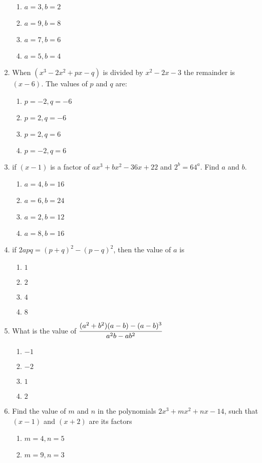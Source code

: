\begin{multicols}{2}
\begin{enumerate}[label={\arabic*.}]
\begin{enumerate}[label={\Alph*.}]
	\item \(a= 3, b =2\)
	\item \(a=9, b=8\)
	\item \(a=7, b =6\)
	\item \(a=5,b=4\)
	\end{enumerate}
\item When $(x^3 - 2x^2 + px -q)$ is divided by $x^2 - 2x -3$ the remainder is $(x-6)$. The values of $p$ and $q$ are: 
	\begin{enumerate}[label={\Alph*.}]
	\item \(p = -2, q = -6\)
	\item \(p = 2, q = -6\)
	\item \(p = 2, q = 6\)
	\item \(p = -2, q = 6\)
	\end{enumerate}
\item if $(x-1)$ is a factor of $ax^3 + bx^2 -36x + 22$ and $2^b = 64^a$. Find $a$ and $b$.
	\begin{enumerate}[label={\Alph*.}]
	\item \(a= 4, b =16\)
	\item \(a = 6, b =24\)
	\item \(a = 2, b =12\)
	\item \(a = 8, b = 16\)
	\end{enumerate}
\item if $2apq = (p+q)^2 - (p-q)^2$, then the value of $a$ is 
	\begin{enumerate}[label={\Alph*.}]
	\item \(1\)
	\item \(2\)
	\item \(4\)
	\item \(8\)
	\end{enumerate}
\item What is the value of $\cfrac{(a^2 + b^2)(a-b) - (a-b)^3}{a^2b - ab^2}$
	\begin{enumerate}[label={\Alph*.}]
	\item \(-1\)
	\item \(-2\)
	\item \(1\)
	\item \(2\)
	\end{enumerate}
\item Find the value of $m$ and $n$ in the polynomials $2x^3 + mx^2 + nx -14$, such that $(x-1)$ and $(x+2)$ are its factors
	\begin{enumerate}[label={\Alph*.}]
	\item \(m = 4, n = 5\)
	\item \(m = 9, n =3\)

\end{enumerate}
\end{enumerate}
\end{multicols}
